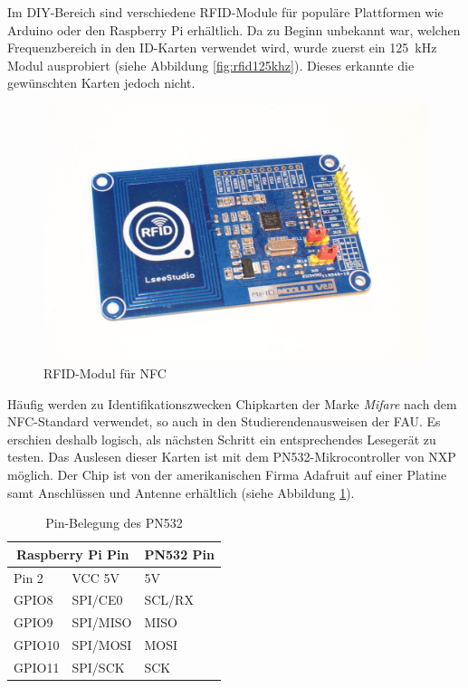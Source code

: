 \documentclass[11pt,a4paper]{IEEEtran}
\begin{document}
Im DIY-Bereich sind verschiedene RFID-Module für populäre Plattformen wie
Arduino oder den Raspberry Pi erhältlich. Da zu Beginn unbekannt war, welchen
Frequenzbereich in den ID-Karten verwendet wird, wurde zuerst ein 
\SI{125}{\kilo\hertz} Modul ausprobiert (siehe Abbildung \ref{fig:rfid125khz}).
Dieses erkannte die gewünschten Karten jedoch nicht. 

\begin{figure}[ht]
    \centering
    \includegraphics[width=.8\columnwidth]{images/nfc_reader}
    \caption{RFID-Modul für NFC}
    \label{fig:rfidnfc}
\end{figure}

Häufig werden zu Identifikationszwecken Chipkarten der Marke \emph{Mifare} nach
dem NFC-Standard verwendet, so auch in den Studierendenausweisen der
FAU\autocite{FauCARD}. Es erschien deshalb logisch, als nächsten Schritt ein
entsprechendes Lesegerät zu testen. Das Auslesen dieser Karten ist mit dem
PN532-Mikrocontroller von NXP möglich. Der Chip ist von der amerikanischen
Firma Adafruit\autocite{AdafruitHP} auf einer Platine samt Anschlüssen und
Antenne erhältlich (siehe Abbildung \ref{fig:rfidnfc}).

\begin{table}[!ht]
    \centering
    \begin{tabular}{ll|l}
        \multicolumn{2}{c}{Raspberry Pi Pin} & PN532 Pin \\
        \hline\hline
        Pin 2   & VCC 5V &   5V  \\
        GPIO8   & SPI/CE0   & SCL/RX \\
        GPIO9   & SPI/MISO & MISO \\
        GPIO10  & SPI/MOSI & MOSI \\
        GPIO11  & SPI/SCK & SCK \\
        \hline
    \end{tabular}
    \caption{Pin-Belegung des PN532}
    \label{tab:pn532pins}
\end{table}
\end{document}
